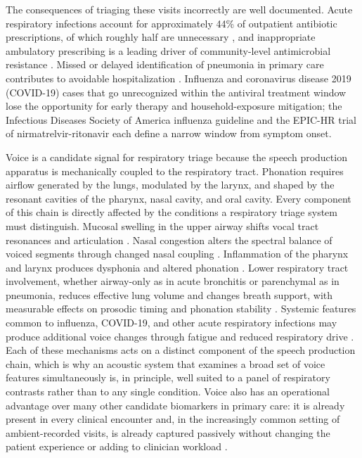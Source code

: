 \documentclass[utf8]{FrontiersinHarvard} %
\begin{document}
The consequences of triaging these visits incorrectly are well documented. Acute respiratory infections account for approximately 44\% of outpatient antibiotic prescriptions, of which roughly half are unnecessary \citep{cdc-outpatient-antibiotic-inappropriate}, and inappropriate ambulatory prescribing is a leading driver of community-level antimicrobial resistance \citep{amr-ambulatory-driver}. Missed or delayed identification of pneumonia in primary care contributes to avoidable hospitalization \citep{pneumonia-missed-pc-hospitalization}. Influenza and coronavirus disease 2019 (COVID-19) cases that go unrecognized within the antiviral treatment window lose the opportunity for early therapy and household-exposure mitigation; the Infectious Diseases Society of America influenza guideline \citep{antiviral-window-influenza-covid} and the EPIC-HR trial of nirmatrelvir-ritonavir \citep{antiviral-window-influenza-covid-2} each define a narrow window from symptom onset.

Voice is a candidate signal for respiratory triage because the speech production apparatus is mechanically coupled to the respiratory tract. Phonation requires airflow generated by the lungs, modulated by the larynx, and shaped by the resonant cavities of the pharynx, nasal cavity, and oral cavity. Every component of this chain is directly affected by the conditions a respiratory triage system must distinguish. Mucosal swelling in the upper airway shifts vocal tract resonances and articulation \citep{behrman-speech-voice-science-2023}. Nasal congestion alters the spectral balance of voiced segments through changed nasal coupling \citep{nasal-coupling-spectral}. Inflammation of the pharynx and larynx produces dysphonia and altered phonation \citep{pharyngitis-laryngitis-dysphonia}. Lower respiratory tract involvement, whether airway-only as in acute bronchitis or parenchymal as in pneumonia, reduces effective lung volume and changes breath support, with measurable effects on prosodic timing and phonation stability \citep{lri-breath-support-prosody}. Systemic features common to influenza, COVID-19, and other acute respiratory infections may produce additional voice changes through fatigue and reduced respiratory drive \citep{behrman-speech-voice-science-2023}. Each of these mechanisms acts on a distinct component of the speech production chain, which is why an acoustic system that examines a broad set of voice features simultaneously is, in principle, well suited to a panel of respiratory contrasts rather than to any single condition. Voice also has an operational advantage over many other candidate biomarkers in primary care: it is already present in every clinical encounter and, in the increasingly common setting of ambient-recorded visits, is already captured passively without changing the patient experience or adding to clinician workload \citep{olson-ambient-ai-scribe-burnout-2025,shah-ambient-ai-scribe-stanford-2025}.
\end{document}
